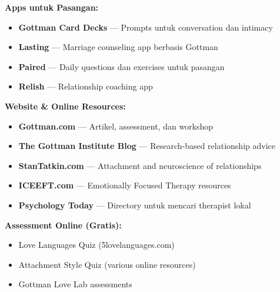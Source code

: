 \begin{tipbox}
\textbf{Apps untuk Pasangan:}
\begin{itemize}[itemsep=0.1cm]
    \item \textbf{Gottman Card Decks} --- Prompts untuk conversation dan intimacy
    \item \textbf{Lasting} --- Marriage counseling app berbasis Gottman
    \item \textbf{Paired} --- Daily questions dan exercises untuk pasangan
    \item \textbf{Relish} --- Relationship coaching app
\end{itemize}

\textbf{Website \& Online Resources:}
\begin{itemize}[itemsep=0.1cm]
    \item \textbf{Gottman.com} --- Artikel, assessment, dan workshop
    \item \textbf{The Gottman Institute Blog} --- Research-based relationship advice
    \item \textbf{StanTatkin.com} --- Attachment and neuroscience of relationships
    \item \textbf{ICEEFT.com} --- Emotionally Focused Therapy resources
    \item \textbf{Psychology Today} --- Directory untuk mencari therapist lokal
\end{itemize}

\textbf{Assessment Online (Gratis):}
\begin{itemize}[itemsep=0.1cm]
    \item Love Languages Quiz (5lovelanguages.com)
    \item Attachment Style Quiz (various online resources)
    \item Gottman Love Lab assessments
\end{itemize}
\end{tipbox}

\vfill

